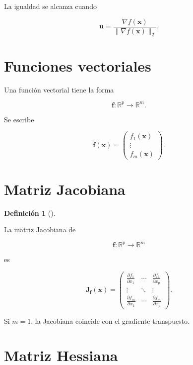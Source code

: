 \documentclass[
  spanish,
  11pt,
  letterpaper,
  DIV=11,
  numbers=noendperiod]{scrreprt}
\theoremstyle{definition}
\newtheorem{definition}{Definición}[chapter]
\theoremstyle{plain}
\theoremstyle{definition}
\theoremstyle{remark}
\begin{document}
La igualdad se alcanza cuando

\[
\mathbf{u}
=
\frac{
\nabla f(\mathbf{x})
}{
\|\nabla f(\mathbf{x})\|_2
}.
\]

\section{Funciones vectoriales}\label{funciones-vectoriales}

Una función vectorial tiene la forma

\[
\mathbf{f}:\mathbb{R}^{p}\to\mathbb{R}^{m}.
\]

Se escribe

\[
\mathbf{f}(\mathbf{x})
=
\begin{pmatrix}
f_1(\mathbf{x})\\
\vdots\\
f_m(\mathbf{x})
\end{pmatrix}.
\]

\section{Matriz Jacobiana}\label{matriz-jacobiana}

\begin{definition}[]\protect\hypertarget{def-jacobiana}{}\label{def-jacobiana}

La matriz Jacobiana de

\[
\mathbf{f}:\mathbb{R}^{p}\to\mathbb{R}^{m}
\]

es

\[
\mathbf{J}_{\mathbf{f}}(\mathbf{x})
=
\begin{pmatrix}
\frac{\partial f_1}{\partial x_1}
&
\cdots
&
\frac{\partial f_1}{\partial x_p}
\\
\vdots
&
\ddots
&
\vdots
\\
\frac{\partial f_m}{\partial x_1}
&
\cdots
&
\frac{\partial f_m}{\partial x_p}
\end{pmatrix}.
\]

\end{definition}

Si \(m=1\), la Jacobiana coincide con el gradiente transpuesto.

\section{Matriz Hessiana}\label{matriz-hessiana}
\end{document}
